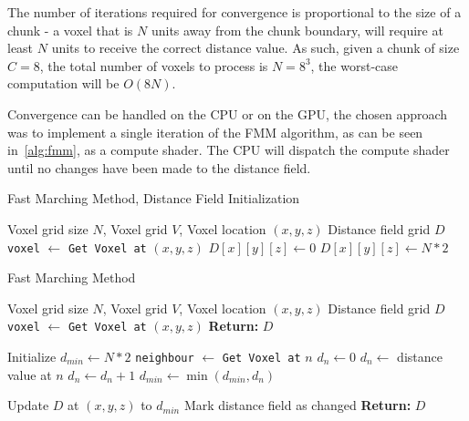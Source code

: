 The number of iterations required for convergence is proportional to the size of a chunk - a voxel that is \(N\) units
away from the chunk boundary, will require at least \(N\) units to receive the correct distance value. As such, given a
chunk of size \(C = 8\), the total number of voxels to process is \(N = 8^3\), the worst-case computation will be
\(O(8N)\).

Convergence can be handled on the CPU or on the GPU, the chosen approach was to implement a single iteration of the FMM
algorithm, as can be seen in~\ref{alg:fmm}, as a compute shader. The CPU will dispatch the compute shader until no
changes have been made to the distance field.

\begin{algorithm}[H]
    \caption{Fast Marching Method, Distance Field Initialization}
    \label{alg:fmm_init}
    \begin{algorithmic}[1]
        \REQUIRE Voxel grid size \(N\), Voxel grid \(V\), Voxel location \((x, y, z)\)
        \ENSURE Distance field grid \(D\)
        \STATE \texttt{voxel} $\gets$ \texttt{Get Voxel at} \((x, y, z)\)
        \STATE \(D[x][y][z] \gets 0\)
        \ELSE
        \STATE \(D[x][y][z] \gets N * 2\)
        \ENDIF
    \end{algorithmic}
\end{algorithm}

\begin{algorithm}[H]
    \caption{Fast Marching Method}
    \label{alg:fmm}
    \begin{algorithmic}[1]
        \REQUIRE Voxel grid size \(N\), Voxel grid \(V\), Voxel location \((x, y, z)\)
        \ENSURE Distance field grid \(D\)
        \STATE \texttt{voxel} $\gets$ \texttt{Get Voxel at} \((x, y, z)\)
        \STATE \textbf{Return:} \(D\)
        \ENDIF

        \STATE Initialize $d_{min} \gets N * 2$
        \STATE \texttt{neighbour} $\gets$ \texttt{Get Voxel at} $n$
        \STATE $d_n \gets 0$
        \ELSE
        \STATE $d_n \gets$ distance value at $n$
        \ENDIF
        \STATE $d_n \gets d_n + 1$
        \STATE $d_{min} \gets \min(d_{min}, d_n)$
        \ENDFOR

        \STATE Update $D$ at $(x, y, z)$ to $d_{min}$
        \STATE Mark distance field as changed
        \ENDIF
        \STATE \textbf{Return:} \(D\)
    \end{algorithmic}
\end{algorithm}


